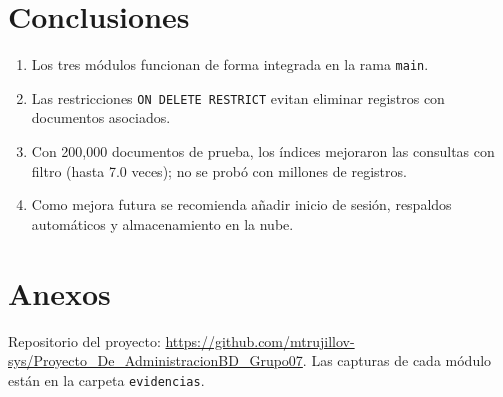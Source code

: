 \documentclass[12pt,a4paper,oneside]{article}
\begin{document}
\section{Conclusiones}
\begin{enumerate}[leftmargin=1.8em]
\item Los tres módulos funcionan de forma integrada en la rama \texttt{main}.
\item Las restricciones \texttt{ON DELETE RESTRICT} evitan eliminar registros con documentos asociados.
\item Con 200{,}000 documentos de prueba, los índices mejoraron las consultas con filtro (hasta 7.0 veces); no se probó con millones de registros.
\item Como mejora futura se recomienda añadir inicio de sesión, respaldos automáticos y almacenamiento en la nube.
\end{enumerate}

\appendix
\section{Anexos}
Repositorio del proyecto: \url{https://github.com/mtrujillov-sys/Proyecto_De_AdministracionBD_Grupo07}. Las capturas de cada módulo están en la carpeta \texttt{evidencias}.
\end{document}
